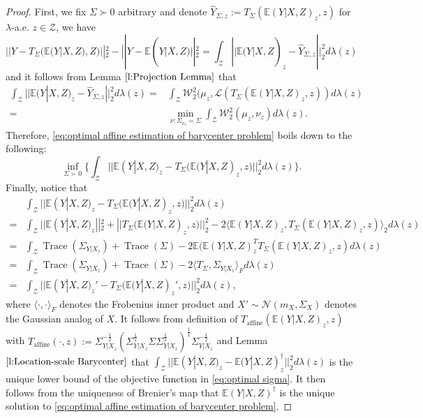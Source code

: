 \documentclass[twoside,11pt]{article}
\DeclareMathOperator{\trace}{Trace}
\begin{document}
\begin{proof}
First, we fix $\Sigma \succ 0$ arbitrary and denote $\hat{Y}_{\Sigma,z} := T_{\Sigma}(\mathbb{E}(Y|X,Z)_z,z)$ for $\lambda$-a.e. $z \in \mathcal{Z}$, we have
\begin{equation}
||Y - T_{\Sigma}(\mathbb{E}(Y|X,Z),Z)||^2_2 - ||Y - \mathbb{E}(Y|X,Z)||^2_2 = \int_{\mathcal{Z}} ||\mathbb{E}(Y|X,Z)_z - \hat{Y}_{\Sigma,z}||^2_2 d\lambda(z)
\end{equation}
and it follows from Lemma $\ref{l:Projection Lemma}$ that
\begin{align*}
\int_{\mathcal{Z}} ||\mathbb{E}(Y|X,Z)_z - \hat{Y}_{\Sigma,z} ||^2_2 d\lambda(z) = & \int_{\mathcal{Z}} \mathcal{W}_2^2(\mu_z,\mathcal{L}(T_{\Sigma}(\mathbb{E}(Y|X,Z)_z,z)) d\lambda(z)\\
= & \min_{\nu: \Sigma_{\nu_z} = \Sigma} \int_{\mathcal{Z}} \mathcal{W}_2^2(\mu_z,\nu_z) d\lambda(z).
\end{align*}
Therefore, \eqref{eq:optimal affine estimation of barycenter problem} boils down to the following:
\begin{equation} \label{eq:optimal sigma}
\inf_{\Sigma \succ 0} \Big\{ \int_{\mathcal{Z}} ||\mathbb{E}(Y|X,Z)_z - T_{\Sigma}(\mathbb{E}(Y|X,Z)_z,z)||^2_2 d\lambda(z) \Big\}.
\end{equation}
Finally, notice that 
\begin{align*}
& \int_{\mathcal{Z}} ||\mathbb{E}(Y|X,Z)_z - T_{\Sigma}(\mathbb{E}(Y|X,Z)_z,z)||^2_2 d\lambda(z)\\
= & \int_{\mathcal{Z}} ||\mathbb{E}(Y|X,Z)_z||^2_2  + ||T_{\Sigma}(\mathbb{E}(Y|X,Z)_z,z)||^2_2 - 2 \langle \mathbb{E}(Y|X,Z)_z,  T_{\Sigma}(\mathbb{E}(Y|X,Z)_z,z)\rangle_2 d\lambda(z)\\
= & \int_{\mathcal{Z}} \trace(\Sigma_{Y|X_z})  + \trace(\Sigma) - 2 \mathbb{E}(\mathbb{E}(Y| X,Z)_z^T T_{\Sigma}(\mathbb{E}(Y|X,Z)_z,z)  d\lambda(z)\\
= & \int_{\mathcal{Z}} \trace(\Sigma_{Y|X_z})  + \trace(\Sigma) - 2 \langle T_{\Sigma},  \Sigma_{Y|X_z} \rangle_F  d\lambda(z)\\
= & \int_{\mathcal{Z}} ||\mathbb{E}(Y|X,Z)_z' -T_{\Sigma}(\mathbb{E}(Y|X,Z)_z',z) ||^2_2 d\lambda(z),
\end{align*}
where $\langle \cdot,\cdot \rangle_F$ denotes the Frobenius inner product and $X' \sim \mathcal{N}(m_X,\Sigma_X)$ denotes the Gaussian analog of $X$. It follows from definition of $T_{\text{affine}}(\mathbb{E}(Y|X,Z)_z,z)$ with $T_{\text{affine}}(\cdot,z) := \Sigma_{Y|X_z}^{-\frac{1}{2}} (\Sigma_{Y|X_z}^{\frac{1}{2}} \Sigma \Sigma_{Y|X_z}^{\frac{1}{2}} )^{\frac{1}{2}} \Sigma_{Y|X_z}^{-\frac{1}{2}}$ and Lemma $\ref{l:Location-scale Barycenter}$ that $\int_{\mathcal{Z}} ||\mathbb{E}(Y|X,Z)_z - \mathbb{E}(Y|X,Z)^{\dagger}_z||^2_2 d\lambda(z)$ is the unique lower bound of the objective function in \eqref{eq:optimal sigma}. It then follows from the uniqueness of Brenier's map that $\mathbb{E}(Y|X,Z)^{\dagger}$ is the unique solution to \eqref{eq:optimal affine estimation of barycenter problem}. 
\end{proof}
\end{document}
